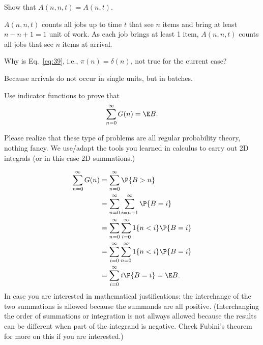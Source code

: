 \begin{question}
   Show that $A(n, n,t) = A(n,t)$. 
\begin{solution}
 $A(n,n,t)$ counts all jobs up to time $t$ that see $n$ items
    and bring at least $n-n+1=1$ unit of work. As each job brings at
    least 1 item, $A(n,n,t)$ counts all jobs that see $n$ items at
    arrival.
\end{solution}
\end{question}

\begin{question}
 Why is Eq.~\eqref{eq:39}, i.e., $\pi(n)=\delta(n)$, not true
    for the current case?
\begin{solution}
 Because arrivals do not occur in single units, but in batches.
\end{solution}
\end{question}

\begin{question}\label{ex:6}
 Use indicator functions to prove that
    \begin{equation*}
      \sum_{n=0}^\infty G(n) = \E B.
    \end{equation*}
\begin{solution}
  Please realize that these type of problems are all regular
  probability theory, nothing fancy. We use/adapt the tools you
  learned in calculus to carry out 2D integrals (or in this case 2D
  summations.)

\begin{align*}
\sum_{n=0}^\infty G(n) 
&= \sum_{n=0}^\infty \P{B>n} \\
&= \sum_{n=0}^\infty \sum_{i=n+1}^\infty \P{B=i}  \\
& = \sum_{n=0}^\infty \sum_{i=0}^\infty 1\{n<i\} \P{B=i} \\
&= \sum_{i=0}^\infty \sum_{n=0}^\infty 1 \{n<i\} \P{B=i} \\
&= \sum_{i=0}^\infty i \P{B=i} = \E B.
\end{align*}
In case you are interested in mathematical justifications: the
interchange of the two summations is allowed because the summands are
all positive. (Interchanging the order of summations or integration is
not allways allowed because the results can be different when part of
the integrand is negative. Check Fubini's theorem for more on this if
you are interested.)

\end{solution}
\end{question}

